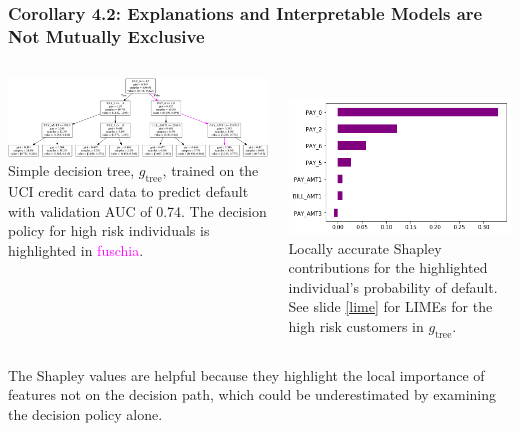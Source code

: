 \documentclass[11pt,
               aspectratio=169,
               hyperref={colorlinks}
               ]{beamer}
\begin{document}
	\begin{frame}[label={dt}]
	
		\frametitle{\large{\textbf{Corollary 4.2}: Explanations and Interpretable Models are Not Mutually Exclusive}}
		
		\begin{columns}
				
			\centering		
			\includegraphics[height=.45\linewidth, width=1.15\linewidth]{img/dt.png}\\
			\vspace{5pt}
  			\tiny{Simple decision tree, $g_{\text{tree}}$, trained on the UCI credit card data to predict default with validation AUC of 0.74. The decision policy for high risk individuals is highlighted in \textcolor{magenta}{fuschia}.}

			\hspace{50pt}
			\centering
			\vspace{2pt}\\
  			\includegraphics[height=.5\linewidth, width=.8\linewidth]{img/shap.png}\\
  			\vspace{5pt}
  			\tiny{Locally accurate Shapley contributions for the highlighted individual's probability of default. See slide \ref{lime} for LIMEs for the high risk customers in $g_{\text{tree}}$.}

		\end{columns}
		\vspace{10pt}

	\scriptsize{The Shapley values are helpful because they highlight the local importance of features not on the decision path, which could be underestimated by examining the decision policy alone.}
	
	\end{frame}
	
\end{document}
